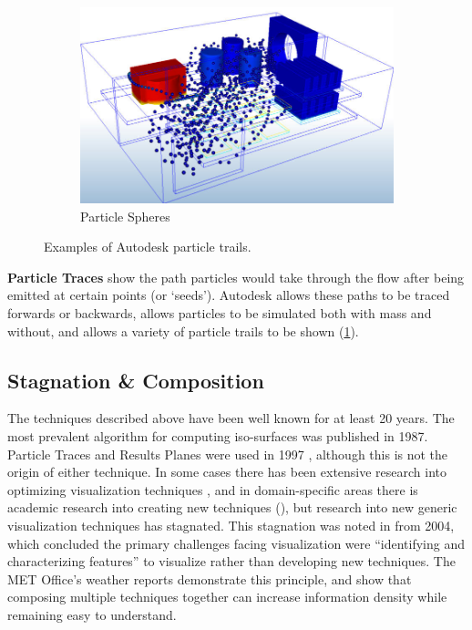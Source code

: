 \begin{figure}
    \begin{subfigure}{0.9\textwidth}%
        \includegraphics[width=\linewidth]{Ch20Research/figures/autodesk_particle_spheres.jpg}
        \caption{Particle Spheres}
    \end{subfigure}%
    \caption{Examples of Autodesk particle trails.}
    \label{fig:AutodeskCFDParticles}
\end{figure}

\textbf{Particle Traces} show the path particles would take through the flow after being emitted at certain points (or `seeds').
Autodesk allows these paths to be traced forwards or backwards, allows particles to be simulated both with mass and without, and allows a variety of particle trails to be shown (\cref{fig:AutodeskCFDParticles}).

\subsection{Stagnation \& Composition}
The techniques described above have been well known for at least 20 years.
The most prevalent algorithm for computing iso-surfaces was published in 1987.
Particle Traces and Results Planes were used in 1997 , although this is not the origin of either technique.
In some cases there has been extensive research into optimizing visualization techniques , and in domain-specific areas there is academic research into creating new techniques (), but research into new generic visualization techniques has stagnated.
This stagnation was noted in  from 2004, which concluded the primary challenges facing visualization were ``identifying and characterizing features'' to visualize rather than developing new techniques.
The MET Office's weather reports demonstrate this principle, and show that composing multiple techniques together can increase information density while remaining easy to understand.

